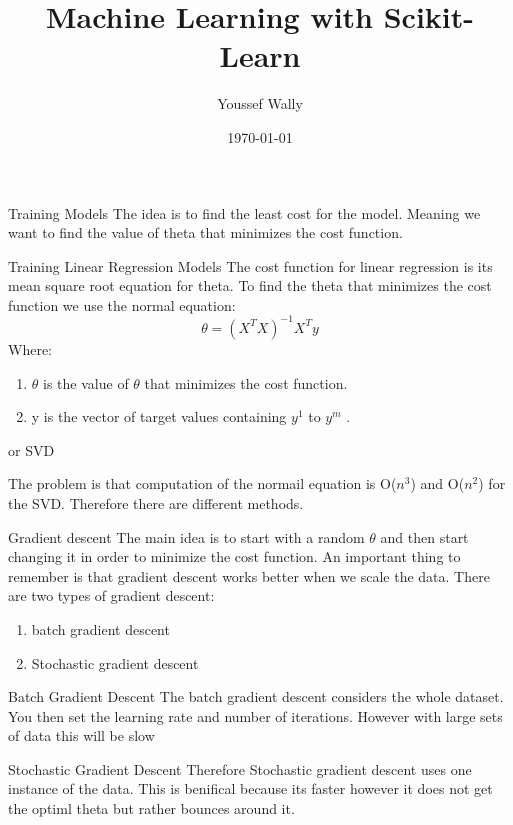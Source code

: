 \documentclass{beamer}
\title[Scikit-Learn]{Machine Learning with Scikit-Learn}
\author{Youssef Wally}
\institute{University Ulm}
\date{\today}
\begin{document}
\begin{frame}
\titlepage
\end{frame}

\begin{frame}{Training Models}
The idea is to find the least cost for the model. Meaning we want to find the value of theta that minimizes the cost function.
\end{frame}
\begin{frame}{Training Linear Regression Models}
The cost function for linear regression is its mean square root equation for theta. To find the theta that minimizes the cost function we use the normal equation:
\begin{equation}
\theta = (X^T X)^{-1}   X^T   y
\end{equation}
Where:
\begin{enumerate}
\item \( \theta \) is the value of \(\theta\)  that minimizes the cost function. 
\item  y is the vector of target values containing \( y^{1}\) to \(y^{m}\) .
\end{enumerate}
or SVD
\end{frame}
\begin{frame}
The problem is that computation of the normail equation is O(\(n^3\)) and O(\(n^2\)) for the SVD. Therefore there are different methods.
\end{frame}
\begin{frame}{Gradient descent}
The main idea is to start with a random \(\theta\) and then start changing it in order to minimize the cost function. An important thing to remember is that gradient descent works better when we scale the data. There are two types of gradient descent:
\begin{enumerate}
\item batch gradient descent
\item Stochastic gradient descent
\end{enumerate}
\end{frame}
\begin{frame}{Batch Gradient Descent}
The batch gradient descent considers the whole dataset. You then set the learning rate and number of iterations. However with large sets of data this will be slow
\end{frame}
\begin{frame}{Stochastic Gradient Descent}
Therefore Stochastic gradient descent uses one instance of the  data. This is benifical because its faster however it does not get the optiml theta but rather bounces around it.
\end{frame}
\end{document}

